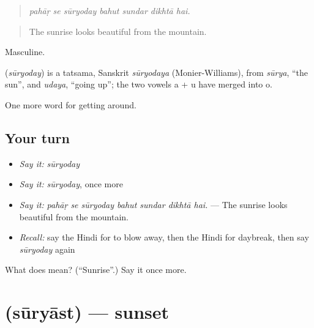 \begin{quote}
      
\end{quote}

\begin{quote}
\emph{pahāṛ se sūryoday bahut sundar dikhtā hai.}
\end{quote}

\begin{quote}
The sunrise looks beautiful from the mountain.
\end{quote}

Masculine.

\begin{cousinweb}
\textbf{} (\emph{sūryoday}) is a tatsama, Sanskrit \emph{sūryodaya} (Monier-Williams), from \emph{sūrya}, \textquotedblleft{}the sun\textquotedblright{}, and \emph{udaya}, \textquotedblleft{}going up\textquotedblright{}; the two vowels a + u have merged into o.
\end{cousinweb}

\begin{grammarlens}[title={What you've built}]
One more word for getting around.
\end{grammarlens}

\subsection*{Your turn}
\begin{itemize}
\raggedright
  \item \emph{Say it:} \emph{sūryoday}
  \item \emph{Say it:} \emph{sūryoday}, once more
  \item \emph{Say it:} \emph{pahāṛ se sūryoday bahut sundar dikhtā hai.} — The sunrise looks beautiful from the mountain.
  \item \emph{Recall:} say the Hindi for to blow away, then the Hindi for daybreak, then say \emph{sūryoday} again
\end{itemize}

\begin{tcolorbox}[breakable,colback=teal!4,colframe=teal!35!black,title={Before you move on}]
What does  mean? (\textquotedblleft{}Sunrise\textquotedblright{}.) Say it once more.
\end{tcolorbox}
\section[\texorpdfstring{\hi{सूर्यास्त} (sūryāst)}{सूर्यास्त (sūryāst)}]{ (sūryāst) — sunset}

